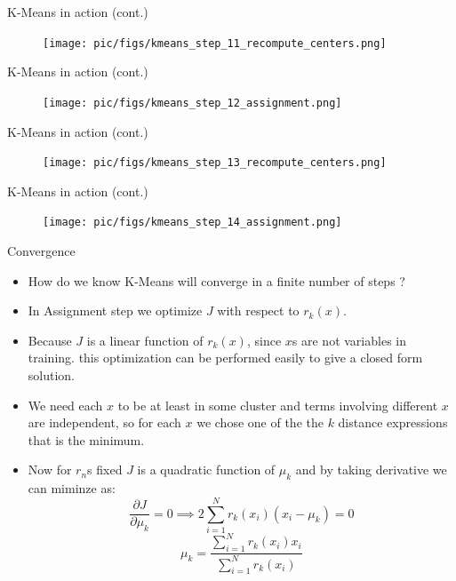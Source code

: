 \documentclass[serif, aspectratio=169]{beamer}
\begin{document}
\begin{frame}{K-Means in action (cont.)}
    \begin{figure}
        \centering
        \texttt{[image: pic/figs/kmeans\_step\_11\_recompute\_centers.png]}
    \end{figure}
\end{frame}
\begin{frame}{K-Means in action (cont.)}
    \begin{figure}
        \centering
        \texttt{[image: pic/figs/kmeans\_step\_12\_assignment.png]}
    \end{figure}
\end{frame}
\begin{frame}{K-Means in action (cont.)}
    \begin{figure}
        \centering
        \texttt{[image: pic/figs/kmeans\_step\_13\_recompute\_centers.png]}
    \end{figure}
\end{frame}
\begin{frame}{K-Means in action (cont.)}
    \begin{figure}
        \centering
        \texttt{[image: pic/figs/kmeans\_step\_14\_assignment.png]}
    \end{figure}
\end{frame}


\begin{frame}{Convergence}
    \begin{itemize}
    \item How do we know K-Means will converge in a finite number of steps ?
        \item  In Assignment step we optimize \( J \) with respect to \( r_k(x) \).
        \item Because \( J \) is a linear function of \( r_k(x) \), since $x$s are not variables in training. this optimization can be performed easily to give a closed form solution.
        \item We need each $x$ to be at least in some cluster and terms involving different $x$ are independent, so for each $x$ we chose one of the the $k$ distance expressions that is the minimum. 
        \item  Now for $r_n$s fixed $J$ is a quadratic function of $\mu_k$ and by taking derivative we can miminze as:
$$
    
        \frac{\partial J}{\partial \mu_k} = 0 \implies 2 \sum_{i=1}^{N} r_k(x_i) \left(x_i - \mu_k \right) = 0
        
$$
$$

        \mu_k = \frac{\sum_{i=1}^{N}{r_k(x_i)x_i}}{\sum_{i=1}^{N} r_k(x_i)}
         
$$
        
    \end{itemize}
\end{frame}
\end{document}
